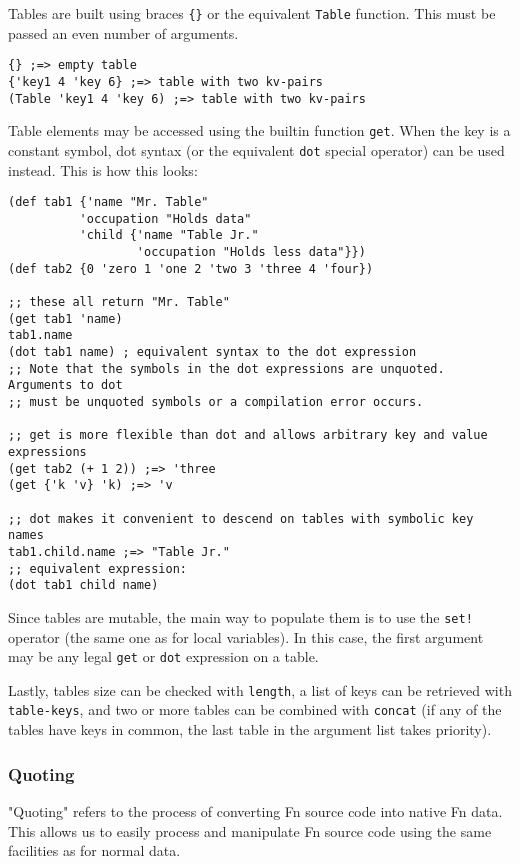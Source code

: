 \documentclass[11pt]{article}
\begin{document}
Tables are built using braces \texttt{\{\}} or the equivalent \texttt{Table} function. This must be
passed an even number of arguments.

\begin{verbatim}
{} ;=> empty table
{'key1 4 'key 6} ;=> table with two kv-pairs
(Table 'key1 4 'key 6) ;=> table with two kv-pairs
\end{verbatim}

Table elements may be accessed using the builtin function \texttt{get}. When the key is a
constant symbol, dot syntax (or the equivalent \texttt{dot} special operator) can be
used instead. This is how this looks:

\begin{verbatim}
(def tab1 {'name "Mr. Table"
          'occupation "Holds data"
          'child {'name "Table Jr." 
                  'occupation "Holds less data"}})
(def tab2 {0 'zero 1 'one 2 'two 3 'three 4 'four})

;; these all return "Mr. Table"
(get tab1 'name)
tab1.name
(dot tab1 name) ; equivalent syntax to the dot expression
;; Note that the symbols in the dot expressions are unquoted. Arguments to dot 
;; must be unquoted symbols or a compilation error occurs.

;; get is more flexible than dot and allows arbitrary key and value expressions
(get tab2 (+ 1 2)) ;=> 'three
(get {'k 'v} 'k) ;=> 'v

;; dot makes it convenient to descend on tables with symbolic key names
tab1.child.name ;=> "Table Jr."
;; equivalent expression:
(dot tab1 child name)
\end{verbatim}

Since tables are mutable, the main way to populate them is to use the \texttt{set!}
operator (the same one as for local variables). In this case, the first argument
may be any legal \texttt{get} or \texttt{dot} expression on a table.

Lastly, tables size can be checked with \texttt{length}, a list of keys can be retrieved
with \texttt{table-keys}, and two or more tables can be combined with \texttt{concat} (if any of
the tables have keys in common, the last table in the argument list takes
priority).


\subsubsection{Quoting}
\label{sec:orgdf14b97}

"Quoting" refers to the process of converting Fn source code into native Fn
data. This allows us to easily process and manipulate Fn source code using the
same facilities as for normal data.
\end{document}
